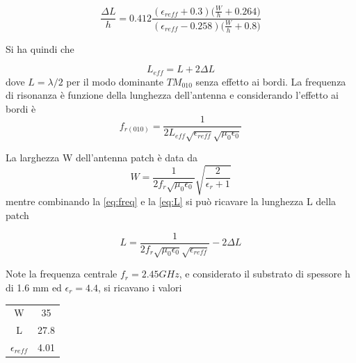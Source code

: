 \documentclass[twoside,twocolumn]{article}
\begin{document}
\begin{equation}
\frac{\Delta L}{h}= 0.412\frac{(\epsilon_{reff}+0.3)\Big(\frac{W}{h}+0.264\Big)}{(\epsilon_{reff}-0.258)\Big(\frac{W}{h}+0.8\Big)}
\end{equation}

Si ha quindi che

\begin{equation}\label{eq:L}
L_{eff}=L+2\Delta L
\end{equation}
dove $L=\lambda/2$ per il modo dominante $TM_{010}$ senza effetto ai bordi.
La frequenza di risonanza è funzione della lunghezza dell'antenna e considerando l'effetto ai bordi è 
\begin{equation} \label{eq:freq}
f_{r(010)}=\frac{1}{2L_{eff}\sqrt{\epsilon_{reff}}\sqrt{\mu_{0}\epsilon_{0}}}
\end{equation}

La larghezza W dell'antenna patch è data da 
\begin{equation}
W=\frac{1}{2f_{r}\sqrt{\mu_{0}\epsilon_{0}}}\sqrt{\frac{2}{\epsilon_{r}+1}}
\end{equation}
mentre combinando la \eqref{eq:freq} e la \eqref{eq:L} si può ricavare la lunghezza L della patch

\begin{equation}
L=\frac{1}{2f_{r}\sqrt{\mu_{0}\epsilon_{0}}\sqrt{\epsilon_{reff}}}-2\Delta L
\end{equation}

Note la frequenza centrale $f_{r}= 2.45GHz$, e considerato il  
substrato di spessore h di 1.6 mm ed $\epsilon_{r}=4.4$,
si ricavano i valori

\begin{center}
\begin{tabular}{ |c|c| } 
 \hline
 W & 35 \\ 
 L & 27.8 \\ 
 $\epsilon_{reff}$ & 4.01 \\
 \hline
\end{tabular}
\end{center}
\end{document}
